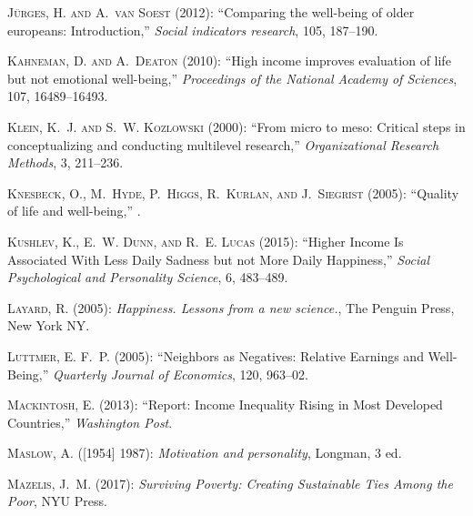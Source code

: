 \documentclass[10pt, letterpaper]{article}
\begin{document}
\begin{spacing}{1.4}
\begin{spacing}{.9}
\begin{thebibliography}{71}
\textsc{J{\"u}rges, H. and A.~van Soest} (2012): \enquote{Comparing the
  well-being of older europeans: Introduction,} \emph{Social indicators
  research}, 105, 187--190.

\textsc{Kahneman, D. and A.~Deaton} (2010): \enquote{High income improves
  evaluation of life but not emotional well-being,} \emph{Proceedings of the
  National Academy of Sciences}, 107, 16489--16493.

\textsc{Klein, K.~J. and S.~W. Kozlowski} (2000): \enquote{From micro to meso:
  Critical steps in conceptualizing and conducting multilevel research,}
  \emph{Organizational Research Methods}, 3, 211--236.

\textsc{Knesbeck, O., M.~Hyde, P.~Higgs, R.~Kurlan, and J.~Siegrist} (2005):
  \enquote{Quality of life and well-being,} .

\textsc{Kushlev, K., E.~W. Dunn, and R.~E. Lucas} (2015): \enquote{Higher
  Income Is Associated With Less Daily Sadness but not More Daily Happiness,}
  \emph{Social Psychological and Personality Science}, 6, 483--489.

\textsc{Layard, R.} (2005): \emph{Happiness. Lessons from a new science.}, The
  Penguin Press, New York NY.

\textsc{Luttmer, E. F.~P.} (2005): \enquote{Neighbors as Negatives: Relative
  Earnings and Well-Being,} \emph{Quarterly Journal of Economics}, 120,
  963--02.

\textsc{Mackintosh, E.} (2013): \enquote{Report: Income Inequality Rising in
  Most Developed Countries,} \emph{Washington Post}.

\textsc{Maslow, A.} ([1954] 1987): \emph{{Motivation and personality}},
  Longman, 3 ed.

\textsc{Mazelis, J.~M.} (2017): \emph{Surviving Poverty: Creating Sustainable
  Ties Among the Poor}, NYU Press.


\end{thebibliography}
\end{spacing}
\end{spacing}
\end{document}
